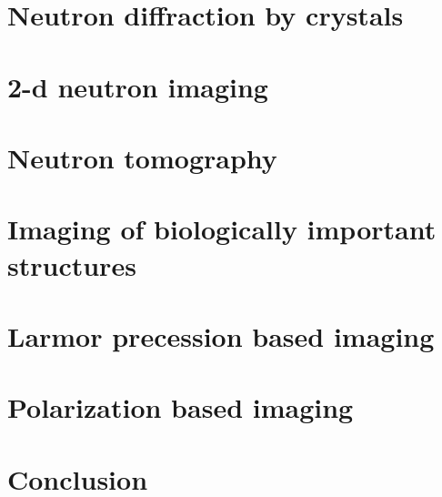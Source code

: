 \documentclass{article}
\numberwithin{equation}{section}
\begin{document}
\section{Neutron diffraction by crystals}\label{s8}
\section{2-d neutron imaging}\label{s9}
\section{Neutron tomography}\label{s10}
\section{Imaging of biologically important structures}\label{s11}
\section{Larmor precession based imaging}\label{s12}
\section{Polarization based imaging}\label{s13}
\section{Conclusion}\label{s14}


\end{document}
